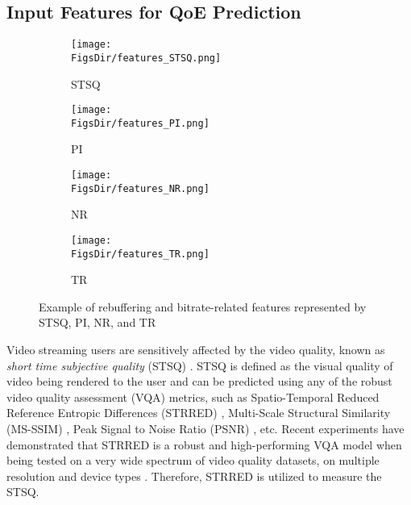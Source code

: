 \subsection{Input Features for QoE Prediction}
\label{BiLSTM:subsec:InputFeatures}


\begin{figure}[tb]
  \centering
  \begin{subfigure}{0.48\linewidth}
    \centering
    \texttt{[image: \\FigsDir/features\_STSQ.png]}
    \caption{STSQ}
    \label{fig:InputFeatures_STSQ}
  \end{subfigure}
  \hfill
  \begin{subfigure}{0.48\linewidth}
    \centering
    \texttt{[image: \\FigsDir/features\_PI.png]}
    \caption{PI}
    \label{fig:InputFeatures_PI}
  \end{subfigure}
  
  \vspace{6pt}
  
  \begin{subfigure}{0.48\linewidth}
    \centering
    \texttt{[image: \\FigsDir/features\_NR.png]}
    \caption{NR}
    \label{fig:InputFeatures_NR}
  \end{subfigure}
  \hfill
  \begin{subfigure}{0.48\linewidth}
    \centering
    \texttt{[image: \\FigsDir/features\_TR.png]}
    \caption{TR}
    \label{fig:InputFeatures_TR}
  \end{subfigure}
  
  \caption{Example of rebuffering and bitrate-related features represented by STSQ, PI, NR, and TR}
  \label{fig:InputFeatures}
\end{figure}


Video streaming users are sensitively affected by the video quality, known as \textit{short time subjective quality} (STSQ) \cite{QoEModel_TimeVaryingSubjectiveQuality}.
STSQ is defined as the visual quality of video being rendered to the user and can be predicted using any of the robust video quality assessment (VQA) metrics, such as Spatio-Temporal Reduced Reference Entropic Differences (STRRED) \cite{STRRED}, Multi-Scale Structural Similarity (MS-SSIM) \cite{MSSSIM}, Peak Signal to Noise Ratio (PSNR) \cite{PSNR}, etc.
Recent experiments have demonstrated that STRRED is a robust and high-performing VQA model when being tested on a very wide spectrum of video quality datasets, on multiple resolution and device types \cite{FeaturePredictionQoE, QoEModel_NLSS, QoEModel_LSTM}.
Therefore, STRRED is utilized to measure the STSQ.

